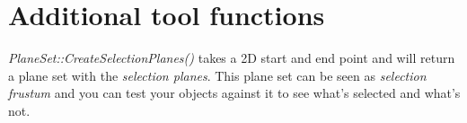 \section{Additional tool functions}
\emph{PlaneSet::CreateSelectionPlanes()} takes a 2D start and end point and will return a plane set with the \emph{selection planes}. This plane set can be seen as \emph{selection frustum} and you can test your objects against it to see what's selected and what's not.





\cleardoublepage
